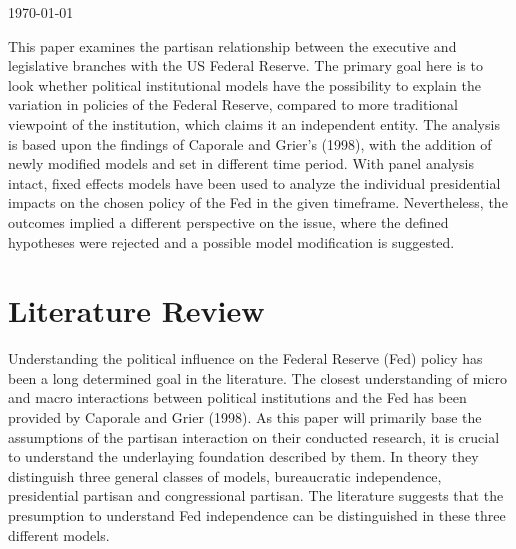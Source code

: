 \documentclass[11pt]{article}
\begin{document}
\begin{titlepage}
	
	
	\vfill\vfill\vfill %
	
	{\large\today} %
	
	
	 
	
	\vfill %
	
\end{titlepage}

\pagebreak
\tableofcontents
\pagebreak

\abstract{}

This paper examines the partisan relationship between the executive and legislative branches with the US Federal Reserve. The primary goal here is to look whether political institutional models have the possibility to explain the variation in policies of the Federal Reserve, compared to more traditional viewpoint of the institution, which claims it an independent entity. The analysis is based upon the findings of Caporale and Grier’s (1998), with the addition of newly modified models and set in different time period. With panel analysis intact, fixed effects models have been used to analyze the individual presidential impacts on the chosen policy of the Fed in the given timeframe. Nevertheless, the outcomes implied a different perspective on the issue, where the defined hypotheses were rejected and a possible model modification is suggested.

\section{Literature Review}

Understanding the political influence on the Federal Reserve (Fed) policy has been a long determined goal in the literature. The closest understanding of micro and macro interactions between political institutions and the Fed has been provided by Caporale and Grier (1998). As this paper will primarily base the assumptions of the partisan interaction on their conducted research, it is crucial to understand the underlaying foundation described by them.
In theory they distinguish three general classes of models, bureaucratic independence, presidential partisan and congressional partisan. The literature suggests that the presumption to understand Fed independence can be distinguished in these three different models.\
\end{document}
